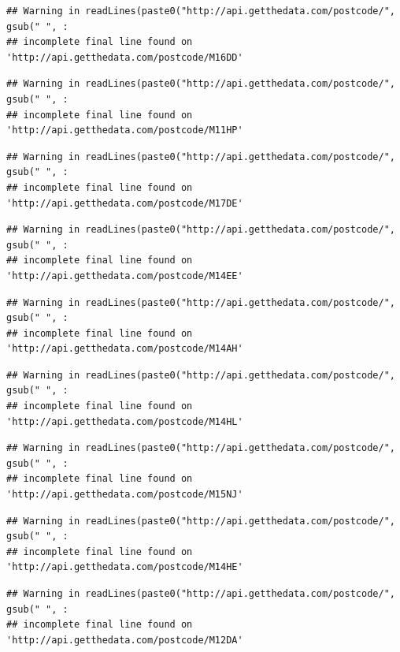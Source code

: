 \documentclass[]{book}
\begin{document}
\begin{verbatim}
## Warning in readLines(paste0("http://api.getthedata.com/postcode/", gsub(" ", :
## incomplete final line found on 'http://api.getthedata.com/postcode/M16DD'
\end{verbatim}

\begin{verbatim}
## Warning in readLines(paste0("http://api.getthedata.com/postcode/", gsub(" ", :
## incomplete final line found on 'http://api.getthedata.com/postcode/M11HP'
\end{verbatim}

\begin{verbatim}
## Warning in readLines(paste0("http://api.getthedata.com/postcode/", gsub(" ", :
## incomplete final line found on 'http://api.getthedata.com/postcode/M17DE'
\end{verbatim}

\begin{verbatim}
## Warning in readLines(paste0("http://api.getthedata.com/postcode/", gsub(" ", :
## incomplete final line found on 'http://api.getthedata.com/postcode/M14EE'
\end{verbatim}

\begin{verbatim}
## Warning in readLines(paste0("http://api.getthedata.com/postcode/", gsub(" ", :
## incomplete final line found on 'http://api.getthedata.com/postcode/M14AH'
\end{verbatim}

\begin{verbatim}
## Warning in readLines(paste0("http://api.getthedata.com/postcode/", gsub(" ", :
## incomplete final line found on 'http://api.getthedata.com/postcode/M14HL'
\end{verbatim}

\begin{verbatim}
## Warning in readLines(paste0("http://api.getthedata.com/postcode/", gsub(" ", :
## incomplete final line found on 'http://api.getthedata.com/postcode/M15NJ'
\end{verbatim}

\begin{verbatim}
## Warning in readLines(paste0("http://api.getthedata.com/postcode/", gsub(" ", :
## incomplete final line found on 'http://api.getthedata.com/postcode/M14HE'
\end{verbatim}

\begin{verbatim}
## Warning in readLines(paste0("http://api.getthedata.com/postcode/", gsub(" ", :
## incomplete final line found on 'http://api.getthedata.com/postcode/M12DA'
\end{verbatim}
\end{document}
